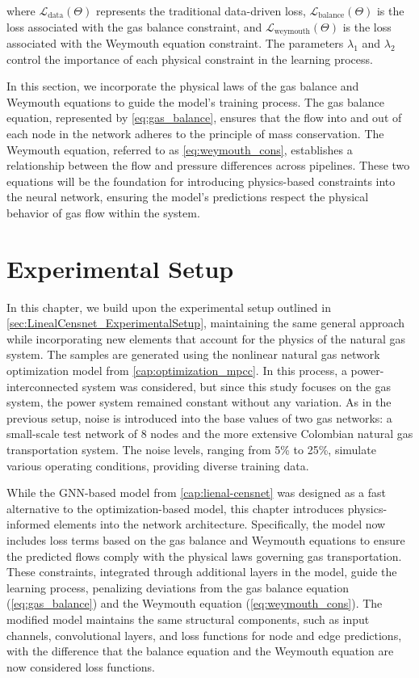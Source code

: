 where \( \mathcal{L}_{\text{data}}(\Theta) \) represents the traditional data-driven loss, \( \mathcal{L}_{\text{balance}}(\Theta) \) is the loss associated with the gas balance constraint, and \( \mathcal{L}_{\text{weymouth}}(\Theta) \) is the loss associated with the Weymouth equation constraint. The parameters \( \lambda_1 \) and \( \lambda_2 \) control the importance of each physical constraint in the learning process.


In this section, we incorporate the physical laws of the gas balance and Weymouth equations to guide the model's training process. The gas balance equation, represented by \cref{eq:gas_balance}, ensures that the flow into and out of each node in the network adheres to the principle of mass conservation. The Weymouth equation, referred to as \cref{eq:weymouth_cons}, establishes a relationship between the flow and pressure differences across pipelines. These two equations will be the foundation for introducing physics-based constraints into the neural network, ensuring the model's predictions respect the physical behavior of gas flow within the system.


\section{Experimental Setup}

In this chapter, we build upon the experimental setup outlined in \cref{sec:LinealCensnet_ExperimentalSetup}, maintaining the same general approach while incorporating new elements that account for the physics of the natural gas system. The samples are generated using the nonlinear natural gas network optimization model from \cref{cap:optimization_mpcc}. In this process, a power-interconnected system was considered, but since this study focuses on the gas system, the power system remained constant without any variation. As in the previous setup, noise is introduced into the base values of two gas networks: a small-scale test network of 8 nodes and the more extensive Colombian natural gas transportation system. The noise levels, ranging from 5\% to 25\%, simulate various operating conditions, providing diverse training data.

While the GNN-based model from \cref{cap:lienal-censnet} was designed as a fast alternative to the optimization-based model, this chapter introduces physics-informed elements into the network architecture. Specifically, the model now includes loss terms based on the gas balance and Weymouth equations to ensure the predicted flows comply with the physical laws governing gas transportation. These constraints, integrated through additional layers in the model, guide the learning process, penalizing deviations from the gas balance equation (\cref{eq:gas_balance}) and the Weymouth equation (\cref{eq:weymouth_cons}). The modified model maintains the same structural components, such as input channels, convolutional layers, and loss functions for node and edge predictions, with the difference that the balance equation and the Weymouth equation are now considered loss functions. 


